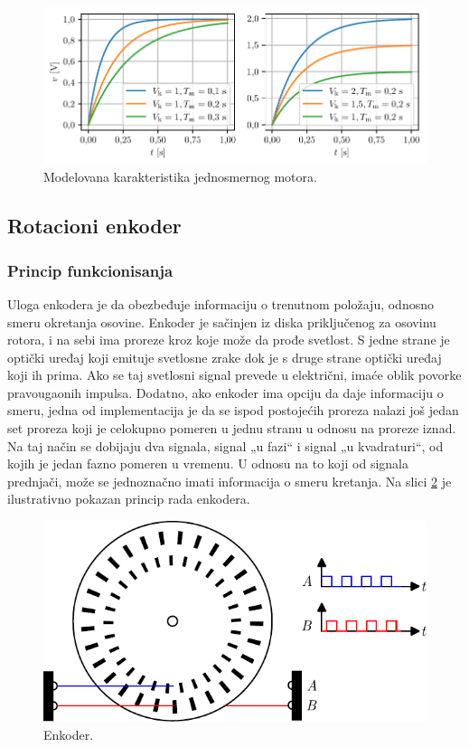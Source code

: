 \documentclass[a4paper, 12pt, diplomski]{etf}
\newcommand{\navod}[1]{„#1“}
\begin{document}
\begin{figure}[h!]
    \centering
    \includegraphics[scale=1]{fig_teorija/DCmodeli.pdf}
    \caption{Modelovana karakteristika jednosmernog motora.}
    \label{DCmodel}
\end{figure}


\subsection{Rotacioni enkoder}
\subsubsection{Princip funkcionisanja} \label{sec:PrincipFunkcionisanja}
Uloga enkodera je da obezbeđuje informaciju o trenutnom položaju, odnosno smeru okretanja osovine. Enkoder je sačinjen iz diska priključenog za osovinu rotora, i na sebi ima proreze kroz koje može da prođe svetlost. S jedne strane je optički uređaj koji emituje svetlosne zrake dok je s druge strane optički uređaj koji ih prima. Ako se taj svetlosni signal prevede u električni, imaće oblik povorke pravougaonih impulsa. Dodatno, ako enkoder ima opciju da daje informaciju o smeru, jedna od implementacija je da se ispod postojećih proreza nalazi još jedan set proreza koji je celokupno pomeren u jednu stranu u odnosu na proreze iznad. 
Na taj način se dobijaju dva signala, signal \navod{u fazi} i signal \navod{u kvadraturi}, od kojih je jedan fazno pomeren u vremenu. U odnosu na to koji od signala prednjači, može se jednoznačno imati informacija o smeru kretanja. Na slici \ref{enc} je ilustrativno pokazan princip rada enkodera.


\begin{figure}[h!]
    \centering
    \includegraphics[scale=1]{fig/enc.pdf}
    \caption{Enkoder.}
    \label{enc}
\end{figure}
\end{document}
